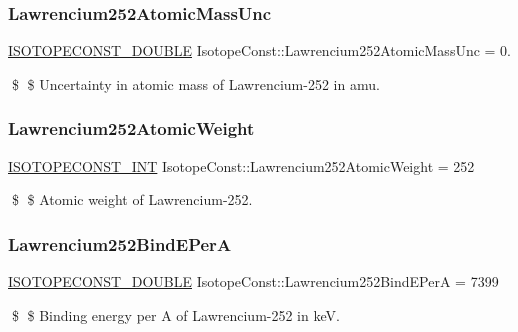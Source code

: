 \subsubsection{\texorpdfstring{Lawrencium252\+Atomic\+Mass\+Unc}{Lawrencium252AtomicMassUnc}}
{\footnotesize\ttfamily \mbox{\hyperlink{group___isotope_const-_macros_ga8f45a7272ce02c0b4c65c44636ed719a}{I\+S\+O\+T\+O\+P\+E\+C\+O\+N\+S\+T\+\_\+\+D\+O\+U\+B\+LE}} Isotope\+Const\+::\+Lawrencium252\+Atomic\+Mass\+Unc = 0.}

\$ \$ Uncertainty in atomic mass of Lawrencium-\/252 in amu. \mbox{\label{group___isotope_const-_lawrencium-_lr252_ga94d2cf48ae849c63f46331e996882043}} 
\subsubsection{\texorpdfstring{Lawrencium252\+Atomic\+Weight}{Lawrencium252AtomicWeight}}
{\footnotesize\ttfamily \mbox{\hyperlink{group___isotope_const-_macros_ga5f18360b3e99483a35c32d789e62621c}{I\+S\+O\+T\+O\+P\+E\+C\+O\+N\+S\+T\+\_\+\+I\+NT}} Isotope\+Const\+::\+Lawrencium252\+Atomic\+Weight = 252}

\$ \$ Atomic weight of Lawrencium-\/252. \mbox{\label{group___isotope_const-_lawrencium-_lr252_ga9782a8203c70ee10ad65f3e894b5017e}} 
\subsubsection{\texorpdfstring{Lawrencium252\+Bind\+E\+PerA}{Lawrencium252BindEPerA}}
{\footnotesize\ttfamily \mbox{\hyperlink{group___isotope_const-_macros_ga8f45a7272ce02c0b4c65c44636ed719a}{I\+S\+O\+T\+O\+P\+E\+C\+O\+N\+S\+T\+\_\+\+D\+O\+U\+B\+LE}} Isotope\+Const\+::\+Lawrencium252\+Bind\+E\+PerA = 7399}

\$ \$ Binding energy per A of Lawrencium-\/252 in keV. \mbox{\label{group___isotope_const-_lawrencium-_lr252_ga664c6daae7fd4bea5f9334346696e02d}} 
